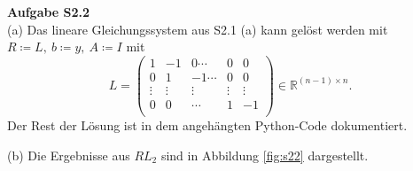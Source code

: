 \documentclass[ngerman, a4paper,12pt]{article}
\begin{document}
\par
\textbf{Aufgabe S2.2} \\
(a) Das lineare Gleichungssystem aus S2.1 (a) kann gelöst werden mit $R \coloneqq L, \ b \coloneqq y, \ A \coloneqq I$ mit
\begin{equation*}
	L = \begin{pmatrix}
	1 &-1 & 0 \cdots &0 &0\\
	0 & 1 & -1 \cdots &0 &0\\
	\vdots & \vdots & \vdots & \vdots & \vdots \\
	0 & 0 & \cdots & 1 & -1\\ 
	\end{pmatrix} \in \mathbb R^{(n-1)\times n}.
\end{equation*}
Der Rest der Lösung ist in dem angehängten Python-Code dokumentiert.
\par
(b) Die Ergebnisse aus $RL_2$ sind in Abbildung \ref{fig:s22} dargestellt. 
\end{document}
